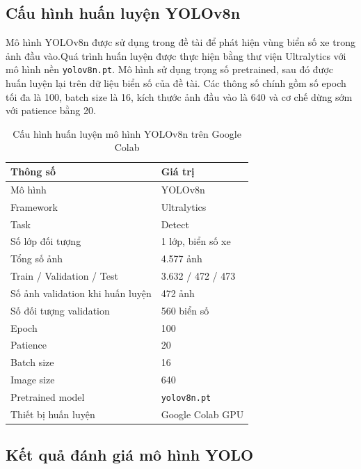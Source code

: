 \documentclass[13pt,a4paper]{report}
\begin{document}
\subsection{Cấu hình huấn luyện YOLOv8n}

Mô hình YOLOv8n được sử dụng trong đề tài để phát hiện vùng biển số xe trong ảnh đầu vào.Quá trình huấn luyện được thực hiện bằng thư viện Ultralytics với mô hình nền \texttt{yolov8n.pt}. Mô hình sử dụng trọng số pretrained, sau đó được huấn luyện lại trên dữ liệu biển số của đề tài. Các thông số chính gồm số epoch tối đa là 100, batch size là 16, kích thước ảnh đầu vào là 640 và cơ chế dừng sớm với patience bằng 20. 

\begin{table}[H]
	\centering
	\caption{Cấu hình huấn luyện mô hình YOLOv8n trên Google Colab}
	\label{tab:yolo_train_config_colab}
	\renewcommand{\arraystretch}{1.4}
	\begin{tabular}{|p{5cm}|p{8cm}|}
		\hline
		\textbf{Thông số} & \textbf{Giá trị} \\
		\hline
		Mô hình & YOLOv8n \\
		\hline
		Framework & Ultralytics \\
		\hline
		Task & Detect \\
		\hline
		Số lớp đối tượng & 1 lớp, biển số xe \\
		\hline
		Tổng số ảnh & 4.577 ảnh \\
		\hline
		Train / Validation / Test & 3.632 / 472 / 473  \\
		\hline
		Số ảnh validation khi huấn luyện & 472 ảnh \\
		\hline
		Số đối tượng validation & 560 biển số \\
		\hline
		Epoch & 100 \\
		\hline
		Patience & 20 \\
		\hline
		Batch size & 16 \\
		\hline
		Image size & 640 \\
		\hline
		Pretrained model & \texttt{yolov8n.pt} \\
		\hline
		Thiết bị huấn luyện & Google Colab GPU \\
		\hline
	\end{tabular}
\end{table}



\subsection{Kết quả đánh giá mô hình YOLO}
\end{document}
